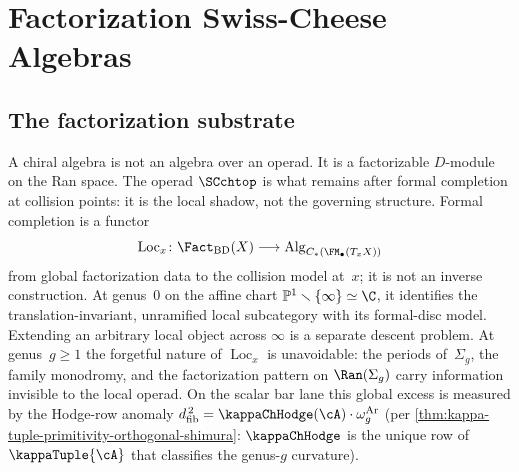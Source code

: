 
\providecommand{\fSet}{\mathsf{fSet}}
\providecommand{\IndCoh}{\operatorname{IndCoh}}
\providecommand{\QCoh}{\operatorname{QCoh}}
\providecommand{\Dmod}{D\text{-}\mathsf{mod}}
\providecommand{\Mbar}{\overline{\cM}}
\providecommand{\colim}{\operatorname{colim}}
\providecommand{\varprojlim}{\underleftarrow{\lim}}
\providecommand{\Obs}{\mathsf{Obs}}
\providecommand{\id}{\mathrm{id}}
\providecommand{\cG}{\mathcal{G}}
\providecommand{\cB}{\mathcal{B}}
\providecommand{\bD}{\mathbb{D}}
\providecommand{\op}{\mathrm{op}}
\providecommand{\PhiFA}{\Phi^{\mathrm{FA}}}
\providecommand{\SpCh}{\mathrm{Sp}_{\mathrm{Ch}}}
\providecommand{\HolFA}{\mathrm{HolFA}}
\providecommand{\EdHolFA}{E_d\text{-}\HolFA}
\providecommand{\EnHolFA}{E_n\text{-}\HolFA}
\providecommand{\intSigma}{\textstyle\int_{\Sigma}}
\providecommand{\hCS}{\mathrm{hCS}}

\chapter{Factorization Swiss-Cheese Algebras}
\label{ch:factorization-swiss-cheese}

\section{The factorization substrate}
\label{sec:factorization-substrate}

A chiral algebra is not an algebra over an operad. It is a
factorizable $D$-module on the Ran space. The operad
$\SCchtop$ is what remains after formal completion at collision
points: it is the local shadow, not the governing structure.
Formal completion is a functor
\[
 \operatorname{Loc}_x\colon
 \Fact_{\mathrm{BD}}(X)
 \longrightarrow
 \operatorname{Alg}_{C_\ast(\FM_\bullet(T_xX))}
\]
from global factorization data to the collision model at~$x$; it is
not an inverse construction. At genus~$0$ on the affine chart
$\mathbb{P}^1\smallsetminus\{\infty\}\simeq\C$, it identifies the
translation-invariant, unramified local subcategory with its
formal-disc model. Extending an arbitrary local object across
$\infty$ is a separate descent problem. At genus~$g \geq 1$ the
forgetful nature of $\operatorname{Loc}_x$ is unavoidable: the periods
of~$\Sigma_g$, the family monodromy, and the factorization pattern on
$\Ran(\Sigma_g)$ carry information invisible to the local operad. On
the scalar bar lane this global excess is measured by the
Hodge-row anomaly
$\dfib^{\,2} = \kappaChHodge(\cA) \cdot \omega_g^{\mathrm{Ar}}$ \textup(per
\cref{thm:kappa-tuple-primitivity-orthogonal-shimura}: $\kappaChHodge$
is the unique row of $\kappaTuple{\cA}$ that classifies the
genus-$g$ curvature\textup).

